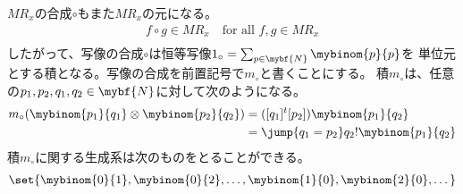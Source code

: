 	$MR_x$の合成$\circ$もまた$MR_x$の元になる。
	\begin{equation}\begin{split} %
		f\circ g\in MR_x \quad\text{for all }f,g\in MR_x \\
	\end{split}\end{equation} %
	したがって、写像の合成$\circ$は恒等写像$1_\circ=\sum_{p\in \mybf{N}}\mybinom{p}{p}$を
	単位元とする積となる。写像の合成を前置記号で$m_\circ$と書くことにする。
	積$m_\circ$は、任意の$p_1,p_2,q_1,q_2\in \mybf{N}$に対して次のようになる。
	\begin{equation}\begin{split} %
		m_\circ(\mybinom{p_1}{q_1}\otimes \mybinom{p_2}{q_2}) 
		&= ([q_1]^t[p_2])\mybinom{p_1}{q_2} \\
		&= \jump{q_1=p_2}q_2!\mybinom{p_1}{q_2} 
	\end{split}\end{equation} %
	積$m_\circ$に関する生成系は次のものをとることができる。
	\begin{equation}\begin{split} %
		\set{\mybinom{0}{1},\mybinom{0}{2},\dots,\mybinom{1}{0},\mybinom{2}{0},\dots}
	\end{split}\end{equation} %

